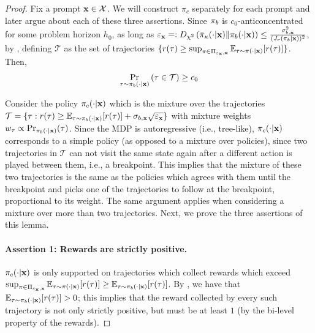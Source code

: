 \begin{proof}
Fix a prompt $\mathbf{x} \in \mathcal{X}$. We will construct $\pi_c$ separately for each prompt and later argue about each of these three assertions. Since $\pi_b$ is $c_0$-anticoncentrated for some problem horizon $h_0$, as long as $\varepsilon_{\mathbf{x}} \mathrel{\mathop=}: D_{\chi^2} \left( \bar{\pi}_\kappa (\cdot|\mathbf{x}) \| \pi_b(\cdot|\mathbf{x}) \right) \le \frac{\sigma_{b,\mathbf{x}}^2}{(J_r(\pi_b|\mathbf{x}))^2}$, by , defining $\mathcal{T}$ as the set of trajectories $\{ r(\tau) \ge \sup_{\pi \in \Pi_{\varepsilon_{\mathbf{x}},\mathbf{x}}} \mathbb{E}_{\tau\sim\pi(\cdot|\mathbf{x})} [r(\tau)] \}$. Then,
\begin{align} \label{eq:plb}
    \Pr_{\tau \sim \pi_b(\cdot|\mathbf{x})} \left( \tau \in \mathcal{T} \right) \ge c_0
\end{align}

Consider the policy $\pi_c (\cdot|\mathbf{x})$ which is the mixture over the trajectories $\mathcal{T} = \{ \tau : r(\tau) \geq  \mathbb{E}_{\tau \sim \pi_b(\cdot \mid \mathbf{x})}[r(\tau)] + \sigma_{b,\mathbf{x}} \sqrt{\varepsilon_{\mathbf{x}}}\}$ with mixture weights $w_\tau \propto \Pr_{\pi_b (\cdot|\mathbf{x})} (\tau)$. Since the MDP is autoregressive (i.e., tree-like), $\pi_c (\cdot|\mathbf{x})$ corresponds to a simple policy (as opposed to a mixture over policies), since two trajectories in $\mathcal{T}$ can not visit the same state again after a different action is played between them, i.e., a breakpoint. This implies that the mixture of these two trajectories is the same as the policies which agrees with them until the breakpoint and picks one of the trajectories to follow at the breakpoint, proportional to its weight. The same argument applies when considering a mixture over more than two trajectories. Next, we prove the three assertions of this lemma.

\paragraph{Assertion 1: Rewards are strictly positive.} $\pi_c(\cdot|\mathbf{x})$ is only supported on trajectories which collect rewards which exceed $\sup_{\pi \in \Pi_{\varepsilon_{\mathbf{x}},\mathbf{x}}} \mathbb{E}_{\tau\sim\pi(\cdot|\mathbf{x})} [r(\tau)] \ge \mathbb{E}_{\tau\sim\pi_b(\cdot|\mathbf{x})} [r(\tau)]$. By , we have that $\mathbb{E}_{\tau \sim\pi_b(\cdot|\mathbf{x})} [r(\tau)] > 0$; this implies that the reward collected by every such trajectory is not only strictly positive, but must be at least $1$ (by the bi-level property of the rewards).



\end{proof}
